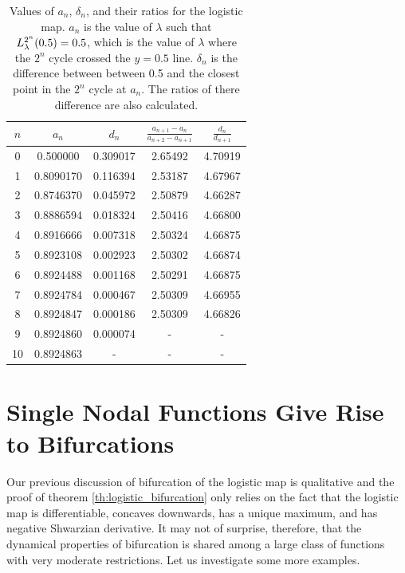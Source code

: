 \begin{table}[ht]
\centering
\begin{tabular}{|c|c|c|c|c|}
\hline
\( n \) & \( a_n \) & \( d_n \) & \(\frac{a_{n+1} - a_n}{a_{n+2} - a_{n+1}}\) & \(\frac{d_n}{d_{n+1}}\) \\ \hline
0 & 0.500000 & 0.309017 & 2.65492 & 4.70919 \\ \hline
1 & 0.8090170 & 0.116394 & 2.53187 & 4.67967 \\ \hline
2 & 0.8746370 & 0.045972 & 2.50879 & 4.66287 \\ \hline
3 & 0.8886594 & 0.018324 & 2.50416 & 4.66800 \\ \hline
4 & 0.8916666 & 0.007318 & 2.50324 & 4.66875 \\ \hline
5 & 0.8923108 & 0.002923 & 2.50302 & 4.66874 \\ \hline
6 & 0.8924488 & 0.001168 & 2.50291 & 4.66875 \\ \hline
7 & 0.8924784 & 0.000467 & 2.50309 & 4.66955 \\ \hline
8 & 0.8924847 & 0.000186 & 2.50309 & 4.66826 \\ \hline
9 & 0.8924860 & 0.000074 & - & - \\ \hline
10 & 0.8924863 & - & - & - \\ \hline
\end{tabular}
\caption{
	Values of \( a_n \), \( \delta_n \), and their ratios for the logistic map.
	$a_n$ is the value of $\lambda$ such that $L_{\lambda}^{2^n}(0.5) = 0.5$, which is the value of $\lambda$ where the $2^n$ cycle crossed the $y=0.5$ line. 
	$\delta_n$ is the difference between between 0.5 and the closest point in the $2^n$ cycle at $a_n$.
	The ratios of there difference are also calculated.
}
\label{tab:feigenbuam_alpha_table_for_logistic}
\end{table}

\section{Single Nodal Functions Give Rise to Bifurcations}

Our previous discussion of bifurcation of the logistic map is qualitative and the proof of theorem \ref{th:logistic_bifurcation} only relies on the fact that the logistic map is differentiable, concaves downwards, has a unique maximum, and has negative Shwarzian derivative. 
It may not of surprise, therefore, that the dynamical properties of bifurcation is shared among a large class of functions with very moderate restrictions.
Let us investigate some more examples.

